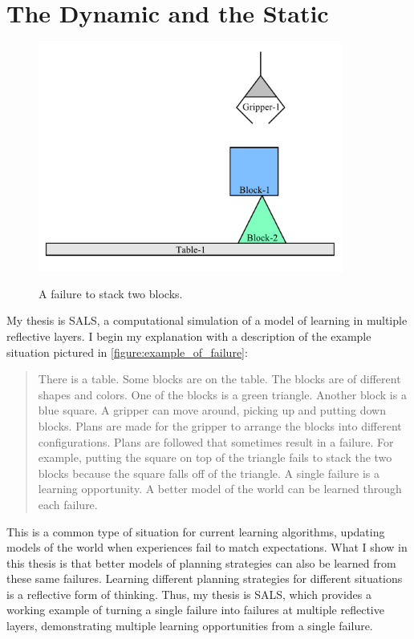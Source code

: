 \chapter{The Dynamic and the Static}
\label{chapter:the_dynamic_and_the_static}

\begin{figure}[bth]
\includegraphics[width=10cm]{gfx/blocks_world_example_failure} \\ \medskip
\caption{A failure to stack two blocks.}
\label{figure:example_of_failure}
\end{figure}

My thesis is SALS, a computational simulation of a model of learning
in multiple reflective layers.  I begin my explanation with a
description of the example situation pictured in
\autoref{figure:example_of_failure}:
\begin{quote}
There is a table.  Some blocks are on the table.  The blocks are of
different shapes and colors.  One of the blocks is a green triangle.
Another block is a blue square.  A gripper can move around, picking up
and putting down blocks.  Plans are made for the gripper to arrange
the blocks into different configurations.  Plans are followed that
sometimes result in a failure.  For example, putting the square on top
of the triangle fails to stack the two blocks because the square falls
off of the triangle.  A single failure is a learning opportunity.  A
better model of the world can be learned through each failure.
\end{quote}
This is a common type of situation for current learning algorithms,
updating models of the world when experiences fail to match
expectations.  What I show in this thesis is that better models of
planning strategies can also be learned from these same failures.
Learning different planning strategies for different situations is a
reflective form of thinking.  Thus, my thesis is SALS, which provides
a working example of turning a single failure into failures at
multiple reflective layers, demonstrating multiple learning
opportunities from a single failure.

